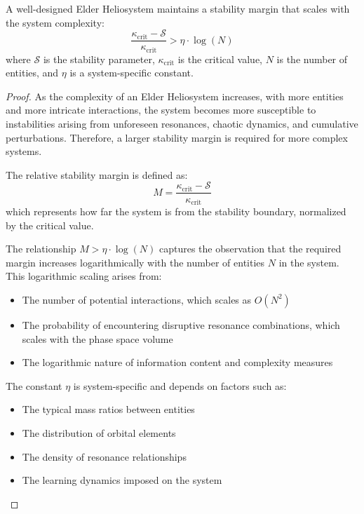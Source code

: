 \begin{theorem}
A well-designed Elder Heliosystem maintains a stability margin that scales with the system complexity:
\begin{equation}
\frac{\kappa_{\text{crit}} - \mathcal{S}}{\kappa_{\text{crit}}} > \eta \cdot \log(N)
\end{equation}
where $\mathcal{S}$ is the stability parameter, $\kappa_{\text{crit}}$ is the critical value, $N$ is the number of entities, and $\eta$ is a system-specific constant.
\end{theorem}

\begin{proof}
As the complexity of an Elder Heliosystem increases, with more entities and more intricate interactions, the system becomes more susceptible to instabilities arising from unforeseen resonances, chaotic dynamics, and cumulative perturbations. Therefore, a larger stability margin is required for more complex systems.

The relative stability margin is defined as:
\begin{equation}
M = \frac{\kappa_{\text{crit}} - \mathcal{S}}{\kappa_{\text{crit}}}
\end{equation}
which represents how far the system is from the stability boundary, normalized by the critical value.

The relationship $M > \eta \cdot \log(N)$ captures the observation that the required margin increases logarithmically with the number of entities $N$ in the system. This logarithmic scaling arises from:
\begin{itemize}
    \item The number of potential interactions, which scales as $O(N^2)$
    \item The probability of encountering disruptive resonance combinations, which scales with the phase space volume
    \item The logarithmic nature of information content and complexity measures
\end{itemize}

The constant $\eta$ is system-specific and depends on factors such as:
\begin{itemize}
    \item The typical mass ratios between entities
    \item The distribution of orbital elements
    \item The density of resonance relationships
    \item The learning dynamics imposed on the system
\end{itemize}


\end{proof}
